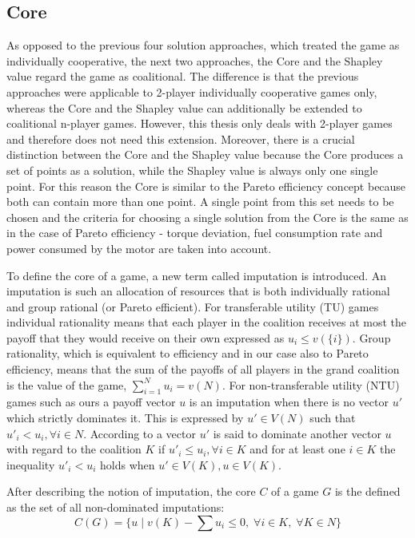 {\subsection{Core}
\label{subsec:core}
As opposed to the previous four solution approaches, which treated the game as individually cooperative, the next two approaches, the Core and the Shapley value regard the game as coalitional. The difference is that the previous approaches were applicable to 2-player individually cooperative games only, whereas the Core and the Shapley value can additionally be extended to coalitional n-player games. However, this thesis only deals with 2-player games and therefore does not need this extension. Moreover, there is a crucial distinction between the Core and the Shapley value because the Core produces a set of points as a solution, while the Shapley value is always only one single point. For this reason the Core is similar to the Pareto efficiency concept because both can contain more than one point. A single point from this set needs to be chosen and the criteria for choosing a single solution from the Core is the same as in the case of Pareto efficiency - torque deviation, fuel consumption rate and power consumed by the motor are taken into account.

To define the core of a game, a new term called imputation is introduced. An imputation is such an allocation of resources that is both individually rational and group rational (or Pareto efficient). For transferable utility (TU) games individual rationality means that each player in the coalition receives at most the payoff that they would receive on their own expressed as $u_i \leq v(\{i\})$. Group rationality, which is equivalent to efficiency and in our case also to Pareto efficiency, means that the sum of the payoffs of all players in the grand coalition is the value of the game, $\sum_{i=1}^{N} u_i = v(N)$. For non-transferable utility (NTU) games such as ours a payoff vector $u$ is an imputation when there is no vector $u'$ which strictly dominates it. This is expressed by $u' \in V(N)$ such that $u'_i < u_i, \forall i\in N$. According to \citet{holler2006einfuhrung} a vector $u'$ is said to dominate another vector $u$ with regard to the coalition $K$ if $u'_i \leq u_i, \forall i \in K$ and for at least one $i \in K$ the inequality $u'_i < u_i$ holds when $u' \in V(K), u \in V(K)$.

After describing the notion of imputation, the core $C$ of a game $G$ is the defined as the set of all non-dominated imputations:
\begin{equation}
\label{eq:core}
C(G) = \{u \;|\; v(K) - \sum u_i \leq 0, \; \forall i \in K, \; \forall K \in N \}
\end{equation}

}
